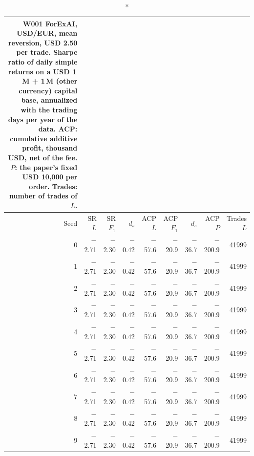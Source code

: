 \begin{longtable}{@{}rrrrrrrrr@{}}
\caption*{\small W001 ForExAI, USD/EUR, mean reversion, USD 2.50 per trade. Sharpe ratio of daily simple returns on a USD 1\,M + 1\,M (other currency) capital base, annualized with the trading days per year of the data. ACP: cumulative additive profit, thousand USD, net of the fee. $P$: the paper's fixed USD 10,000 per order. Trades: number of trades of $L$.}\\
\toprule
Seed & SR $L$ & SR $F_1$ & $d_s$ & ACP $L$ & ACP $F_1$ & $d_s$ & ACP $P$ & Trades $L$\\ \midrule\endhead
0 & $-$2.71 & $-$2.30 & $-$0.42 & $-$57.6 & $-$20.9 & $-$36.7 & $-$200.9 & 41999\\
1 & $-$2.71 & $-$2.30 & $-$0.42 & $-$57.6 & $-$20.9 & $-$36.7 & $-$200.9 & 41999\\
2 & $-$2.71 & $-$2.30 & $-$0.42 & $-$57.6 & $-$20.9 & $-$36.7 & $-$200.9 & 41999\\
3 & $-$2.71 & $-$2.30 & $-$0.42 & $-$57.6 & $-$20.9 & $-$36.7 & $-$200.9 & 41999\\
4 & $-$2.71 & $-$2.30 & $-$0.42 & $-$57.6 & $-$20.9 & $-$36.7 & $-$200.9 & 41999\\
5 & $-$2.71 & $-$2.30 & $-$0.42 & $-$57.6 & $-$20.9 & $-$36.7 & $-$200.9 & 41999\\
6 & $-$2.71 & $-$2.30 & $-$0.42 & $-$57.6 & $-$20.9 & $-$36.7 & $-$200.9 & 41999\\
7 & $-$2.71 & $-$2.30 & $-$0.42 & $-$57.6 & $-$20.9 & $-$36.7 & $-$200.9 & 41999\\
8 & $-$2.71 & $-$2.30 & $-$0.42 & $-$57.6 & $-$20.9 & $-$36.7 & $-$200.9 & 41999\\
9 & $-$2.71 & $-$2.30 & $-$0.42 & $-$57.6 & $-$20.9 & $-$36.7 & $-$200.9 & 41999\\
\bottomrule\end{longtable}
